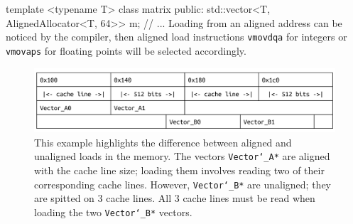 \documentclass[logo,bsc,singlespacing,parskip]{infthesis}
\newenvironment{VerbatimCompact}
  {\vspace*{-2.5mm}\VerbatimEnvironment
   \par\Verbatim}
  {\endVerbatim\vspace*{-2.4mm}}
\begin{document}
\begin{VerbatimCompact}
template <typename T>
class matrix {
public:
  std::vector<T, AlignedAllocator<T, 64>> m;
  // ...
}
\end{VerbatimCompact}
Loading from an aligned address can be noticed by the compiler, then aligned load instructions \texttt{vmovdqa} for integers or \texttt{vmovaps} for floating points will be selected accordingly. 

\begin{figure} [H]
    \begin{center}
        \includegraphics[width=\linewidth]{image/cacheline.png}
    \end{center}
    \caption{This example highlights the difference between aligned and unaligned loads in the memory. The vectors \texttt{Vector\char`_A*} are aligned with the cache line size; loading them involves reading two of their corresponding cache lines. However, \texttt{Vector\char`_B*} are unaligned; they are spitted on 3 cache lines. All 3 cache lines must be read when loading the two \texttt{Vector\char`_B*} vectors. }
    \label{fig:cacheline}
\end{figure}




\end{document}
